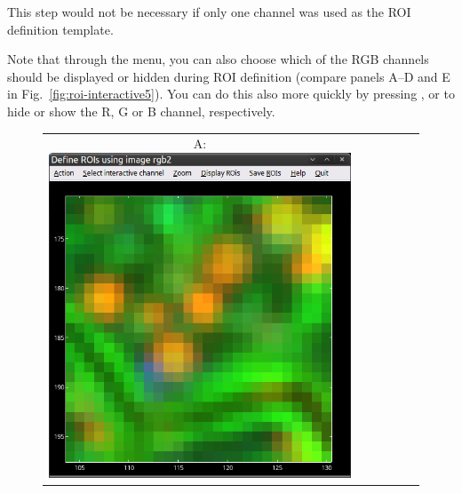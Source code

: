 \nb
\bul This step would not be necessary if only one channel was used as the ROI definition template. 

\bul Note that through the  menu, you can also choose which of the RGB channels should be displayed or hidden during ROI definition (compare panels A--D and E in Fig.~\ref{fig:roi-interactive5}). You can do this also more quickly by pressing ,  or  to hide or show the R, G or B channel, respectively.

\begin{figure}[!ht]
\centering
\begin{tabular}{cccccc}
A: \includegraphics[scale=0.23]{figs3/LANS-roi-interactive0}
&

\end{tabular}
\end{figure}

